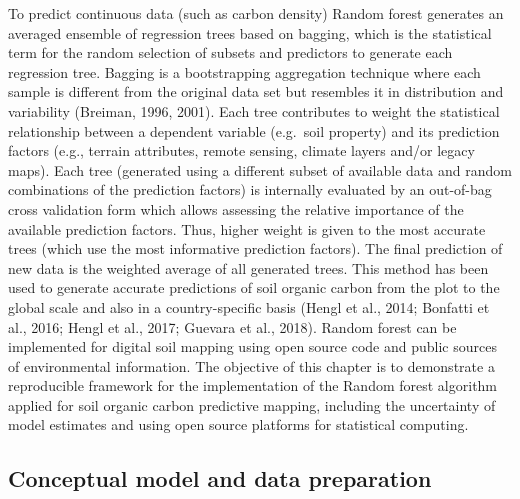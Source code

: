 \documentclass[10pt,b5paper,]{book}
\theoremstyle{definition}
\theoremstyle{definition}
\theoremstyle{definition}
\theoremstyle{remark}
\begin{document}
To predict continuous data (such as carbon density) Random forest
generates an averaged ensemble of regression trees based on bagging,
which is the statistical term for the random selection of subsets and
predictors to generate each regression tree. Bagging is a bootstrapping
aggregation technique where each sample is different from the original
data set but resembles it in distribution and variability (Breiman,
1996, 2001). Each tree contributes to weight the statistical
relationship between a dependent variable (e.g.~soil property) and its
prediction factors (e.g., terrain attributes, remote sensing, climate
layers and/or legacy maps). Each tree (generated using a different
subset of available data and random combinations of the prediction
factors) is internally evaluated by an out-of-bag cross validation form
which allows assessing the relative importance of the available
prediction factors. Thus, higher weight is given to the most accurate
trees (which use the most informative prediction factors). The final
prediction of new data is the weighted average of all generated trees.
This method has been used to generate accurate predictions of soil
organic carbon from the plot to the global scale and also in a
country-specific basis (Hengl et al., 2014; Bonfatti et al., 2016; Hengl
et al., 2017; Guevara et al., 2018). Random forest can be implemented
for digital soil mapping using open source code \citep[e.g., the R
package of random forest, see][]{breiman2017cutler} and public sources
of environmental information. The objective of this chapter is to
demonstrate a reproducible framework for the implementation of the
Random forest algorithm applied for soil organic carbon predictive
mapping, including the uncertainty of model estimates and using open
source platforms for statistical computing.

\hypertarget{conceptual-model-and-data-preparation}{%
\subsection{Conceptual model and data
preparation}\label{conceptual-model-and-data-preparation}}
\end{document}
